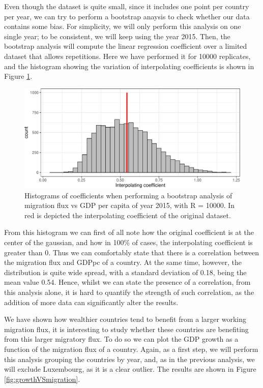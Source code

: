 \documentclass[
]{article}
\begin{document}
Even though the dataset is quite small, since it includes one point per
country per year, we can try to perform a bootstrap anaysis to check
whether our data contains some bias. For simplicity, we will only
perform this analysis on one single year; to be consistent, we will keep
using the year 2015. Then, the bootstrap analysis will compute the
linear regression coefficient over a limited dataset that allows
repetitions. Here we have performed it for 10000 replicates, and the
histogram showing the variation of interpolating coefficients is shown
in Figure \ref{fig:bootModel}.

\begin{figure}
\centering
\includegraphics{main_files/figure-latex/bootModel-1.pdf}
\caption{Histograms of coefficients when performing a bootstrap analysis
of migration flux vs GDP per capita of year 2015, with R = 10000. In red
is depicted the interpolating coefficient of the original dataset.
\label{fig:bootModel}}
\end{figure}

From this histogram we can first of all note how the original
coefficient is at the center of the gaussian, and how in 100\% of cases,
the interpolating coefficient is greater than 0. Thus we can comfortably
state that there is a correlation between the migration flux and GDPpc
of a country. At the same time, however, the distribution is quite wide
spread, with a standard deviation of 0.18, being the mean value 0.54.
Hence, whilst we can state the presence of a correlation, from this
analysis alone, it is hard to quantify the strength of such correlation,
as the addition of more data can significantly alter the results.

We have shown how wealthier countries tend to benefit from a larger
working migration flux, it is interesting to study whether these
countries are benefiting from this larger migratory flux. To do so we
can plot the GDP growth as a function of the migration flux of a
country. Again, as a first step, we will perform this analysis grouping
the countries by year, and, as in the previous analysis, we will exclude
Luxembourg, as it is a clear outlier. The results are shown in Figure
\ref{fig:growthVSmigration}.
\end{document}
